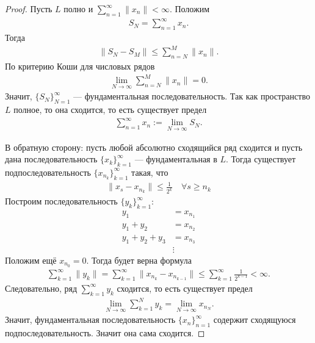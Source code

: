 \begin{proof}
 Пусть $L$ полно и $\sum_{n=1}^{\infty} \|x_n\| < \infty$. Положим \begin{align*}
  S_N = \sum_{n=1}^{\infty} x_n
 .\end{align*} Тогда \begin{align*}
  \| S_N - S_M \| \leqslant \sum_{n=N}^{M} \|x_n\|
 .\end{align*} По критерию Коши для числовых рядов \begin{align*}
  \lim_{N \to \infty} \sum_{n=N}^{M} \| x_n \| = 0 
 .\end{align*} Значит, $\{S_{N}\}_{N=1}^{\infty} $ --- фундаментальная последовательность. Так как пространство $L$ полное, то она сходится, то есть существует предел \begin{align*}
  \sum_{n=1}^{\infty} x_n := \lim_{N \to \infty} S_N 
 .\end{align*} 

 В обратную сторону: пусть любой абсолютно сходящийся ряд сходится и пусть дана последовательность $\{x_{k}\}_{k=1}^{\infty} $ --- фундаментальная в $L$. Тогда существует подпоследовательность $\{x_{n_k}\}_{k=1}^{\infty} $ такая, что \begin{align*}
  \|x_s - x_{n_k}\| \leqslant \frac{1}{2^{k}} \quad \forall s \geqslant n_k
 \end{align*} Построим последовательность $\{y_{k}\}_{k=1}^{\infty} $:  \begin{align*}
 y_1 &= x_{n_1} \\
 y_1 + y_2 &= x_{n_2} \\
 y_1 + y_2 +y_3 &= x_{n_3} \\
 &\vdots
\end{align*} Положим ещё $x_{n_0} = 0$. Тогда будет верна формула \begin{align*}
\sum_{k=1}^{\infty} \| y_k \| = \sum_{k=1}^{\infty} \| x_{n_k} - x_{n_{k-1}} \| \leqslant \sum_{k=1}^{\infty} \frac{1}{2^{k-1}} < \infty
.\end{align*} Следовательно, ряд $\sum_{k=1}^{\infty} y_k$ сходится, то есть существует предел \begin{align*}
\lim_{N \to \infty} \sum_{k=1}^{N} y_k = \lim_{N \to \infty} x_{n_N}  
.\end{align*} Значит, фундаментальная последовательность $\{x_{n}\}_{n=1}^{\infty} $ содержит сходящуюся подпоследовательность. Значит она сама сходится.
\end{proof}
